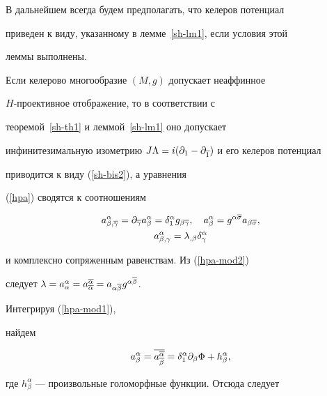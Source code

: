 В дальнейшем всегда будем предполагать, что келеров потенциал


приведен к виду, указанному в лемме~\ref{sh-lm1}, если условия этой


леммы выполнены.





Если келерово многообразие $(M,g)$ допускает неаффинное


$H$-проективное отображение, то в соответствии с


теоремой~\ref{sh-th1} и леммой~\ref{sh-lm1} оно допускает


инфинитезимальную изометрию $J\Lambda =i(\partial_1-\partial_{\overline{1}})$ и его келеров потенциал


приводится к виду (\ref{sh-bis2}), а уравнения


(\ref{hpa}) сводятся к соотношениям


\begin{gather}


\label{hpa-mod1}


a^{\alpha}_{\beta,\ol\gamma}= \pl{\ol\gamma} a^{\alpha}_{\beta} =


\delta^{\alpha}_{1} g_{\beta\ol\gamma}, \quad


a^{\alpha}_{\beta} = g^{\alpha\ol\sigma} a_{\beta\ol\sigma},\\


\label{hpa-mod2}


a^{\alpha}_{\beta,\gamma}= \lambda_{,\beta} \delta^\alpha_\gamma


\end{gather}


и комплексно сопряженным равенствам. Из (\ref{hpa-mod2})


следует $\lambda = a^\alpha_\alpha = a_{\ol\alpha}^{\ol\alpha} =


a_{\alpha\ol\beta} g^{\alpha\ol\beta}$.


Интегрируя (\ref{hpa-mod1}),


найдем


\begin{equation}


\label{hpa-sol1}


a^\alpha_\beta = \ol{a^{\ol\alpha}_{\ol\beta}} =


\delta^\alpha_1 \pl\beta \Phi + h^\alpha_\beta,


\end{equation}


где $h^\alpha_\beta$ --- произвольные голоморфные функции. Отсюда следует


